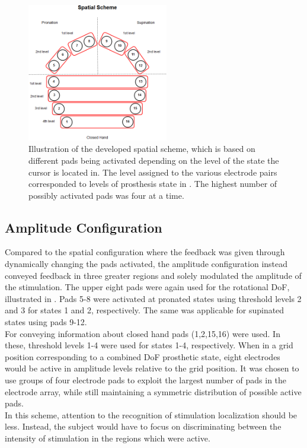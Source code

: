 \begin{figure}[H]                 
	\includegraphics[width=0.55\textwidth]{figures/El_array_spatial}  
	\caption{Illustration of the developed spatial scheme, which is based on different pads being activated depending on the level of the state the cursor is located in. The level assigned to the various electrode pairs corresponded to levels of prosthesis state in . The highest number of possibly activated pads was four at a time.}
	\label{fig:spatial} 
\end{figure}


\subsection{Amplitude Configuration}

Compared to the spatial configuration where the feedback was given through dynamically changing the pads activated, the amplitude configuration instead conveyed feedback in three greater regions and solely modulated the amplitude of the stimulation. The upper eight pads were again used for the rotational DoF, illustrated in . Pads 5-8 were activated at pronated states using threshold levels 2 and 3 for states 1 and 2, respectively. The same was applicable for supinated states using pads 9-12. \\
For conveying information about closed hand pads (1,2,15,16) were used. In these, threshold levels 1-4 were used for states 1-4, respectively. When in a grid position corresponding to a combined DoF prosthetic state, eight electrodes would be active in amplitude levels relative to the grid position. It was chosen to use groups of four electrode pads to exploit the largest number of pads in the electrode array, while still maintaining a symmetric distribution of possible active pads. \\ 
In this scheme, attention to the recognition of stimulation localization should be less. Instead, the subject would have to focus on discriminating between the intensity of stimulation in the regions which were active.           

